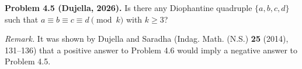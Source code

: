 \textbf{Problem 4.5 (Dujella, 2026).} Is there any Diophantine quadruple $\{a,b,c,d\}$ such that $a \equiv b \equiv c \equiv d \pmod{k}$ with $k \geqslant 3$?

\medskip

\textit{Remark.} It was shown by Dujella and Saradha (Indag. Math. (N.S.) \textbf{25} (2014), 131--136) that a positive answer to Problem 4.6 would imply a negative answer to Problem 4.5.
